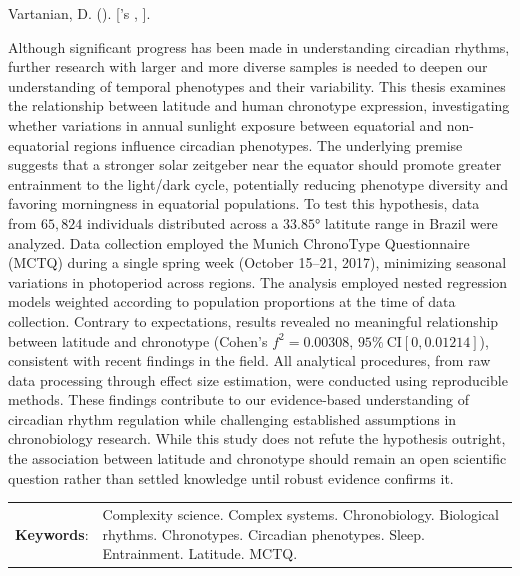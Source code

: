 \documentclass[
12pt,
openright,
oneside,
a4paper,
chapter=TITLE,
section=TITLE,
french,
spanish,
brazil,
english
]{abntex2}
\renewcommand{\resumoname}{Abstract}
\renewcommand{\resumoname}{Resumo}
\renewcommand{\resumoname}{Resumen}
\renewcommand{\resumoname}{Résumé}
\providecommand{\imprimiruniversidade}{}
\providecommand{\imprimirtipodetituloacademico}{}
\newenvironment{resumoenv}[1][\resumoname]{
  \pretextualchapter{#1}
  \begingroup
  \setlength{\parindent}{0cm}
  \setlength{\parskip}{\smallskipamount} %
  \AtBeginEnvironment{tabular}{\normalsize}
  \renewcommand{\arraystretch}{1}
  \setlength{\aboverulesep}{0ex}
  \setlength{\belowrulesep}{0ex}
  \setlength{\arrayrulewidth}{0pt}
  \setlength{\tabcolsep}{0cm}
  \vspace{-\smallskipamount} %
  \begin{SingleSpace}
}{
  \end{SingleSpace}
  \cleardoublepage
  \endgroup
}
\renewcommand{\arraystretch}{1.5}
\begin{document}
\begin{resumoenv}[\resumoname]
Vartanian, D. ({\imprimirdata}). \textit{\imprimirtitulo} [{\imprimirtipodetituloacademico}'s {\imprimirtipotrabalho}, {\imprimiruniversidade}].


Although significant progress has been made in understanding circadian
rhythms, further research with larger and more diverse samples is needed
to deepen our understanding of temporal phenotypes and their
variability. This thesis examines the relationship between latitude and
human chronotype expression, investigating whether variations in annual
sunlight exposure between equatorial and non-equatorial regions
influence circadian phenotypes. The underlying premise suggests that a
stronger solar zeitgeber near the equator should promote greater
entrainment to the light/dark cycle, potentially reducing phenotype
diversity and favoring morningness in equatorial populations. To test
this hypothesis, data from \(65,824\) individuals distributed across a
\(33.85°\) latitute range in Brazil were analyzed. Data collection
employed the Munich ChronoType Questionnaire (MCTQ) during a single
spring week (October 15--21, 2017), minimizing seasonal variations in
photoperiod across regions. The analysis employed nested regression
models weighted according to population proportions at the time of data
collection. Contrary to expectations, results revealed no meaningful
relationship between latitude and chronotype (Cohen's \(f^2 = 0.00308\),
\(95\% \ \text{CI}[0, 0.01214]\)), consistent with recent findings in
the field. All analytical procedures, from raw data processing through
effect size estimation, were conducted using reproducible methods. These
findings contribute to our evidence-based understanding of circadian
rhythm regulation while challenging established assumptions in
chronobiology research. While this study does not refute the hypothesis
outright, the association between latitude and chronotype should remain
an open scientific question rather than settled knowledge until robust
evidence confirms it.


\begin{tabular}{p{2.5cm} p{13.4cm}}
  \textbf{Keywords}: & Complexity science. Complex systems. Chronobiology. Biological rhythms. Chronotypes. Circadian phenotypes. Sleep. Entrainment. Latitude. MCTQ.
\end{tabular}
\end{resumoenv}
\end{document}
